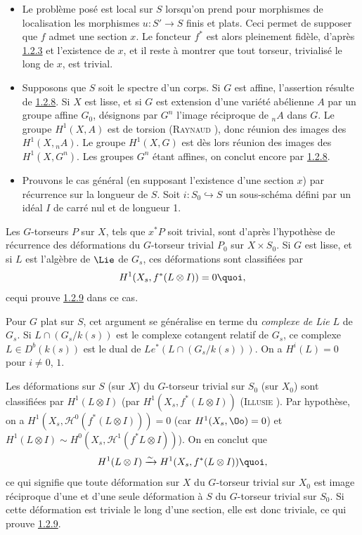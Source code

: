 \begin{itemize}
\item[a.] Le problème posé est local sur $S$ lorsqu'on prend pour
  morphismes de localisation les morphismes $u:S'\rightarrow S$ finis
  et plats. Ceci permet de supposer que $f$ admet une section
$x$. Le
  foncteur $f^{\ast}$ est alors pleinement fidèle, d'après
  \hyperref[XVIII.lem1.2.3]{1.2.3} et
  l'existence de $x$, et il reste à montrer que tout torseur,
  trivialisé le long de $x$, est trivial.

\item[b.] Supposons que $S$ soit le spectre d'un corps. Si $G$ est
  affine, l'assertion résulte de \hyperref[XVIII.lem1.2.8]{1.2.8}. Si $X$ est
  lisse, et si $G$ 
  est extension d'une variété abélienne $A$ par un groupe affine
  $G_{0}$, désignons par $G^{n}$ l'image réciproque de ${}_{n}A$ dans
  $G$. Le groupe $H^{1}(X,A)$ est de torsion (\textsc{Raynaud}
  \cite[XIII 2.6]{5}),
  donc réunion des images des $H^{1}(X,{}_{n}A)$. Le groupe
  $H^{1}(X,G)$ est dès lors réunion des images des
  $H^{1}(X,G^{n})$. Les groupes $G^{n}$ étant affines, on conclut
  encore par \hyperref[XVIII.lem1.2.8]{1.2.8}.

\item[c.] Prouvons le cas général (en supposant l'existence d'une
  section $x$) par récurrence sur la longueur de $S$. Soit
  $i:S_{0}\hookrightarrow S$ un sous-schéma défini par un idéal $I$ de
  carré nul et de longueur 1.
\end{itemize}

Les $G$-torseurs $P$ sur $X$, tels que $x^{\ast}P$ soit trivial, sont
d'après l'hypothèse de récurrence des déformations du $G$-torseur
trivial $P_{0}$ sur $X\times S_{0}$. Si $G$ est lisse, et si $L$ est
l'algèbre de $\Lie$ de $G_{s}$, ces déformations sont classifiées par 
$$
H^{1}(X_{s},f^{\ast}(L\otimes I))=0{\quoi},
$$
ce\pageoriginale qui prouve \hyperref[XVIII.lem1.2.9]{1.2.9} dans ce cas.

Pour $G$ plat sur $S$, cet argument se généralise en terme du
\emph{complexe de Lie} $L$ de $G_{s}$. Si $L\cap (G_{s}/k(s))$ est le
complexe cotangent relatif de $G_{s}$, ce complexe $L\in
D^{b}(k(s))$ est le dual de  $Le^{\ast}(L\cap (G_{s}/k(s)))$. On a
$H^{i}(L)=0$ pour
$i\neq 0$, $1$.

Les déformations sur $S$ (\resp sur $X$) du $G$-torseur trivial sur
$S_{0}$ (\resp sur $X_{0}$) sont classifiées par $H^{1}(L\otimes I)$
(\resp par $H^{1}(X_{s},f^{\ast}(L\otimes I))$ (\textsc{Illusie}
\cite[VII~2.4.4~(ii)]{3}).
Par hypothèse, on a $H^{1}(X_{s},ℋ^0(f^{\ast}(L\otimes
I)))=0$ (car $H^{1}(X_{s},\Oo)=0$) et $H^{1}(L\otimes I)\sim
H^0(X_{s}, ℋ^{1}(f^{\ast}L\otimes I))$). On en conclut que
$$
H^{1}(L\otimes I)\xrightarrow{\sim} H^{1}(X_{s},f^{\ast}(L\otimes
I)){\quoi},
$$
ce qui signifie que toute déformation sur $X$ du $G$-torseur trivial
sur $X_{0}$ est image réciproque d'une et d'une seule déformation à
$S$ du $G$-torseur trivial sur $S_{0}$. Si cette déformation est
triviale le long d'une section, elle est donc triviale, ce qui prouve
\hyperref[XVIII.lem1.2.9]{1.2.9}.

